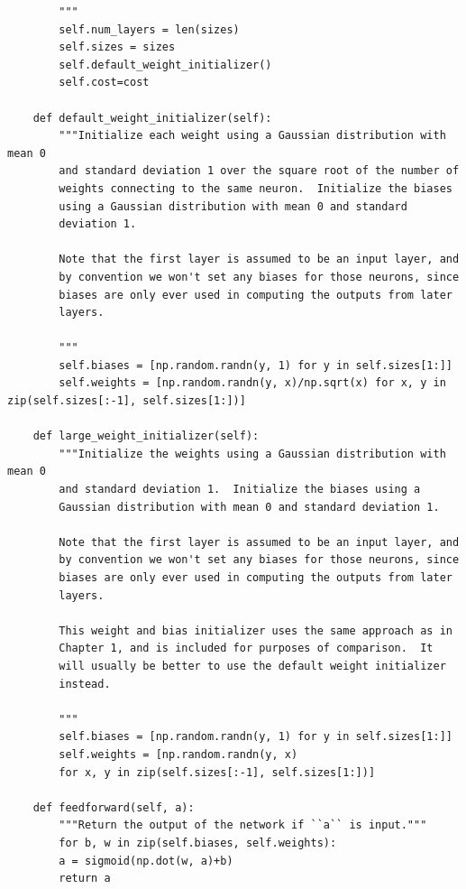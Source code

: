 \documentclass[a4paper,twoside,10pt]{book}
\begin{document}
\begin{lstlisting}
		"""
		self.num_layers = len(sizes)
		self.sizes = sizes
		self.default_weight_initializer()
		self.cost=cost

	def default_weight_initializer(self):
		"""Initialize each weight using a Gaussian distribution with mean 0
		and standard deviation 1 over the square root of the number of
		weights connecting to the same neuron.  Initialize the biases
		using a Gaussian distribution with mean 0 and standard
		deviation 1.
	
		Note that the first layer is assumed to be an input layer, and
		by convention we won't set any biases for those neurons, since
		biases are only ever used in computing the outputs from later
		layers.
		
		"""
		self.biases = [np.random.randn(y, 1) for y in self.sizes[1:]]
		self.weights = [np.random.randn(y, x)/np.sqrt(x) for x, y in zip(self.sizes[:-1], self.sizes[1:])]

	def large_weight_initializer(self):
		"""Initialize the weights using a Gaussian distribution with mean 0
		and standard deviation 1.  Initialize the biases using a
		Gaussian distribution with mean 0 and standard deviation 1.
		
		Note that the first layer is assumed to be an input layer, and
		by convention we won't set any biases for those neurons, since
		biases are only ever used in computing the outputs from later
		layers.
		
		This weight and bias initializer uses the same approach as in
		Chapter 1, and is included for purposes of comparison.  It
		will usually be better to use the default weight initializer
		instead.
		
		"""
		self.biases = [np.random.randn(y, 1) for y in self.sizes[1:]]
		self.weights = [np.random.randn(y, x)
		for x, y in zip(self.sizes[:-1], self.sizes[1:])]
	
	def feedforward(self, a):
		"""Return the output of the network if ``a`` is input."""
		for b, w in zip(self.biases, self.weights):
		a = sigmoid(np.dot(w, a)+b)
		return a
	

\end{lstlisting}
\end{document}
